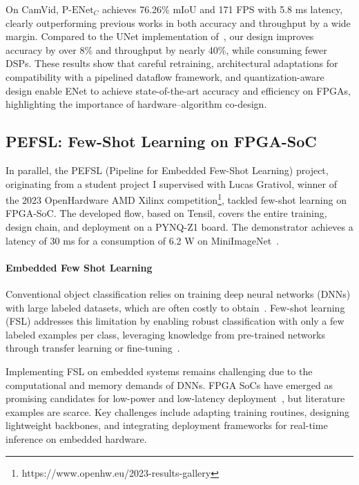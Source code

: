 \documentclass[11pt]{report}
\begin{document}
On CamVid, $\text{P-ENet}_{C}$ achieves 76.26\% mIoU and 171 FPS with 5.8 ms latency, clearly outperforming previous works in both accuracy and throughput by a wide margin. Compared to the UNet implementation of~\cite{Miyama_2021}, our design improves accuracy by over 8\% and throughput by nearly 40\%, while consuming fewer DSPs. These results show that careful retraining, architectural adaptations for compatibility with a pipelined dataflow framework, and quantization-aware design enable ENet to achieve state-of-the-art accuracy and efficiency on FPGAs, highlighting the importance of hardware–algorithm co-design.


\subsection{PEFSL: Few-Shot Learning on FPGA-SoC}

In parallel, the PEFSL (Pipeline for Embedded Few-Shot Learning) project, originating from a student project I supervised with Lucas Grativol, winner of the 2023 OpenHardware AMD Xilinx competition\footnote{https://www.openhw.eu/2023-results-gallery}, tackled few-shot learning on FPGA-SoC. The developed flow, based on Tensil, covers the entire training, design chain, and deployment on a PYNQ-Z1 board. The demonstrator achieves a latency of 30 ms for a consumption of 6.2 W on MiniImageNet~\cite{grativol:hal-04559365}.

\paragraph{Embedded Few Shot Learning}

Conventional object classification relies on training deep neural networks (DNNs) with large labeled datasets, which are often costly to obtain~\cite{fredriksson2020data}. Few-shot learning (FSL) addresses this limitation by enabling robust classification with only a few labeled examples per class, leveraging knowledge from pre-trained networks through transfer learning or fine-tuning~\cite{weiss2016survey,b2}.

Implementing FSL on embedded systems remains challenging due to the computational and memory demands of DNNs. FPGA SoCs have emerged as promising candidates for low-power and low-latency deployment~\cite{b10,b9,zhang2021low}, but literature examples are scarce. Key challenges include adapting training routines, designing lightweight backbones, and integrating deployment frameworks for real-time inference on embedded hardware.
\end{document}
